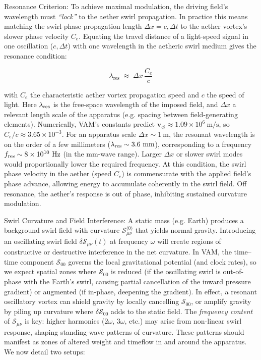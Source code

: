 \documentclass[twocolumn,aps,pre,floatfix,nofootinbib]{revtex4-2}
\begin{document}
Resonance Criterion:  To achieve maximal modulation, the driving field’s wavelength must \textit{“lock”} to the aether swirl propagation. In practice this means matching the swirl-phase propagation length $\Delta x = c,\Delta t$ to the aether vortex’s slower phase velocity $C_e$. Equating the travel distance of a light-speed signal in one oscillation ($c,\Delta t$) with one wavelength in the aetheric swirl medium gives the resonance condition:

\[ \lambda_\textrm{res} \;\approx\; \Delta x \,\frac{C_e}{c} \]



with $C_e$ the characteristic aether vortex propagation speed and $c$ the speed of light. Here $\lambda_{\rm res}$ is the free-space wavelength of the imposed field, and $\Delta x$ a relevant length scale of the apparatus (e.g. spacing between field-generating elements). Numerically, VAM’s constants predict $\mathbf{v}_{\scriptscriptstyle\boldsymbol{\circlearrowleft}} \approx 1.09\times10^6~\text{m/s}$, so $C_e/c \approx 3.65\times10^{-3}$. For an apparatus scale $\Delta x \sim 1~\text{m}$, the resonant wavelength is on the order of a few millimeters ($\lambda_{\rm res}\sim3.6~\text{mm}$), corresponding to a frequency $f_{\rm res}\sim 8\times10^{10}~\text{Hz}$ (in the mm-wave range). Larger $\Delta x$ or slower swirl modes would proportionally lower the required frequency. At this condition, the swirl phase velocity in the aether (speed $C_e$) is commensurate with the applied field’s phase advance, allowing energy to accumulate coherently in the swirl field. Off resonance, the aether’s response is out of phase, inhibiting sustained curvature modulation.


Swirl Curvature and Field Interference:  A static mass (e.g. Earth) produces a background swirl field with curvature \(\mathcal{S}_{\mu\nu}^{\text{(0)}}\) that yields normal gravity. Introducing an oscillating swirl field $\delta \mathcal{S}_{\mu\nu}(t)$ at frequency $\omega$ will create regions of constructive or destructive interference in the net curvature. In VAM, the time–time component $\mathcal{S}_{\text{00}}$ governs the local gravitational potential (and clock rates), so we expect spatial zones where $\mathcal{S}_{\text{00}}$ is reduced (if the oscillating swirl is out-of-phase with the Earth’s swirl, causing partial cancellation of the inward pressure gradient) or augmented (if in-phase, deepening the gradient). In effect, a resonant oscillatory vortex can shield gravity by locally cancelling $\mathcal{S}_{\text{00}}$, or amplify gravity by piling up curvature where $\delta \mathcal{S}_{\text{00}}$ adds to the static field. The \textit{frequency content} of $\mathcal{S}_{\mu\nu}$ is key: higher harmonics ($2\omega$, $3\omega$, etc.) may arise from non-linear swirl response, shaping standing-wave patterns of curvature. These patterns should manifest as zones of altered weight and timeflow in and around the apparatus. We now detail two setups:
\end{document}
